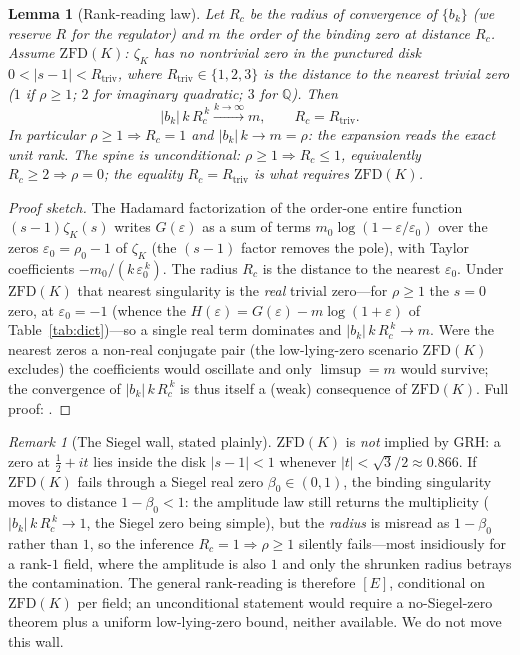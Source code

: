 \documentclass[a4paper,11pt]{article}
\theoremstyle{plain}
\newtheorem{lemma}{Lemma}
\theoremstyle{definition}
\theoremstyle{remark}
\newtheorem{remark}{Remark}
\newcommand{\eps}{\varepsilon}
\newcommand{\Q}{\mathbb{Q}}
\begin{document}
\begin{lemma}[Rank-reading law]\label{lem:rank}
Let $R_c$ be the radius of convergence of $\{b_k\}$ (we reserve $R$ for the regulator) and $m$ the order of
the binding zero at distance $R_c$. Assume $\mathrm{ZFD}(K)$: $\zeta_K$ has no nontrivial zero in the
punctured disk $0<|s-1|<R_{\mathrm{triv}}$, where $R_{\mathrm{triv}}\in\{1,2,3\}$ is the distance to the
nearest trivial zero ($1$ if $\rho\ge1$; $2$ for imaginary quadratic; $3$ for $\Q$). Then
\begin{equation}
|b_k|\,k\,R_c^{\,k}\xrightarrow{k\to\infty} m,\qquad R_c=R_{\mathrm{triv}} .
\label{eq:rank}
\end{equation}
In particular $\rho\ge1\Rightarrow R_c=1$ and $|b_k|\,k\to m=\rho$: the expansion reads the exact unit rank.
The spine is unconditional: $\rho\ge1\Rightarrow R_c\le1$, equivalently $R_c\ge2\Rightarrow\rho=0$; the
equality $R_c=R_{\mathrm{triv}}$ is what requires $\mathrm{ZFD}(K)$.
\end{lemma}

\begin{proof}[Proof sketch]
The Hadamard factorization of the order-one entire function $(s-1)\zeta_K(s)$ writes $G(\eps)$ as a sum of
terms $m_0\log(1-\eps/\eps_0)$ over the zeros $\eps_0=\rho_0-1$ of $\zeta_K$ (the $(s-1)$ factor removes the
pole), with Taylor coefficients $-m_0/(k\,\eps_0^{\,k})$. The radius $R_c$ is the distance to the nearest
$\eps_0$. Under $\mathrm{ZFD}(K)$ that nearest singularity is the \emph{real} trivial zero---for $\rho\ge1$
the $s=0$ zero, at $\eps_0=-1$ (whence the $H(\eps)=G(\eps)-m\log(1+\eps)$ of Table~\ref{tab:dict})---so a
single real term dominates and $|b_k|\,k\,R_c^{\,k}\to m$. Were the nearest zeros a non-real conjugate pair
(the low-lying-zero scenario $\mathrm{ZFD}(K)$ excludes) the coefficients would oscillate and only
$\limsup=m$ would survive; the convergence of $|b_k|\,k\,R_c^{\,k}$ is thus itself a (weak) consequence of
$\mathrm{ZFD}(K)$. Full proof: \cite[$T1\_lemma\_E1\_proof\_v0\_2$]{repo}.
\end{proof}

\begin{remark}[The Siegel wall, stated plainly]\label{rem:zfd}
$\mathrm{ZFD}(K)$ is \emph{not} implied by GRH: a zero at $\tfrac12+it$ lies inside the disk $|s-1|<1$
whenever $|t|<\sqrt3/2\approx0.866$. If $\mathrm{ZFD}(K)$ fails through a Siegel real zero
$\beta_0\in(0,1)$, the binding singularity moves to distance $1-\beta_0<1$: the amplitude law still returns
the multiplicity ($|b_k|\,k\,R_c^{\,k}\to1$, the Siegel zero being simple), but the \emph{radius} is misread
as $1-\beta_0$ rather than $1$, so the inference $R_c=1\Rightarrow\rho\ge1$ silently fails---most insidiously
for a rank-$1$ field, where the amplitude is also $1$ and only the shrunken radius betrays the contamination.
The general rank-reading is therefore $[E]$, conditional on $\mathrm{ZFD}(K)$ per field; an unconditional
statement would require a no-Siegel-zero theorem plus a uniform low-lying-zero bound, neither available. We
do not move this wall.
\end{remark}
\end{document}
